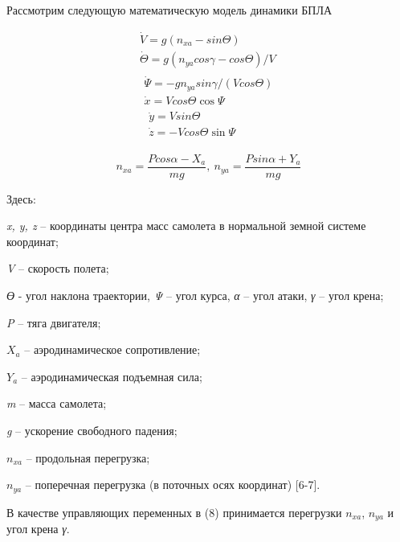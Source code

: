 Рассмотрим следующую математическую модель динамики БПЛА


\begin{equation}
\begin{matrix}
\dot{V} = g(n_{xa} - sin\Theta) \\
\dot{\Theta} = g(n_{ya}cos\gamma - cos\Theta)/V \\
\begin{matrix}
\dot{\Psi} = - gn_{ya}sin\gamma/(Vcos\Theta) \\
\dot{x} = Vcos\Theta\cos\Psi \\
\begin{matrix}
\dot{y} = Vsin\Theta \\
\dot{z} = - Vcos\Theta\sin\Psi
\end{matrix}
\end{matrix}
\end{matrix} 
\end{equation} 


\begin{equation}
n_{xa} = \frac{Pcos\alpha - X_{a}}{mg},\ n_{ya} = \frac{Psin\alpha + Y_{a}}{mg}
\end{equation} 

Здесь:

\emph{x, y, z} -- координаты центра масс самолета в нормальной земной
системе координат;

\emph{V} -- скорость полета;

\emph{ϴ} - угол наклона траектории, \emph{Ψ} -- угол курса, \emph{α} --
угол атаки, \emph{γ} -- угол крена;

\emph{P} -- тяга двигателя;

\(X_{a}\) -- аэродинамическое сопротивление;

\(Y_{a}\) -- аэродинамическая подъемная сила;

\emph{m} -- масса самолета;

\emph{g} -- ускорение свободного падения;

\(n_{xa}\) -- продольная перегрузка;

\(n_{ya}\) -- поперечная перегрузка (в поточных осях координат)
{[}6-7{]}.

В качестве управляющих переменных в (8) принимается перегрузки
\(n_{xa}\), \(n_{ya}\) и угол крена \emph{γ}.

